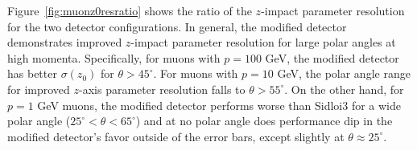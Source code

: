 Figure~\ref{fig:muonz0resratio} shows the ratio of the $z$-impact parameter resolution 
for the two detector configurations. 
In general, the modified detector demonstrates improved $z$-impact parameter resolution for large polar angles at high momenta.
Specifically, for muons with $p = 100$ GeV, the modified detector has better $\sigma(z_{0})$ for $\theta > 45^{\circ}$.
For muons with $p = 10$ GeV, the polar angle range for improved $z$-axis parameter resolution falls to $\theta > 55^{\circ}$.
On the other hand, for $p = 1$ GeV muons, the modified detector performs worse than Sidloi3 for 
a wide polar angle ($25^{\circ} < \theta < 65^{\circ}$) and at no polar angle does performance
dip in the modified detector's favor outside of the error bars, except slightly at $\theta \approx 25^{\circ}$.

